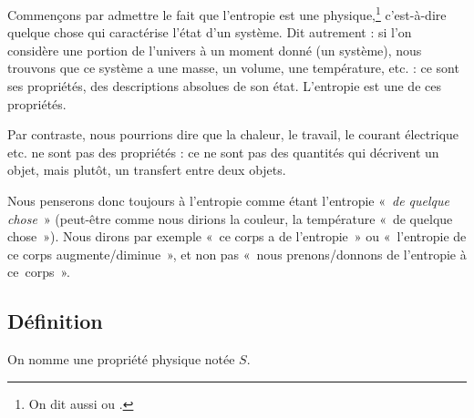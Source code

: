 		Commençons par admettre le fait que l’entropie est une  physique,\footnote{On dit aussi  ou .} c’est-à-dire quelque chose qui caractérise l’état d’un système. Dit autrement : si l’on considère une portion de l’univers à un moment donné (un système), nous trouvons que ce système a une masse, un volume, une température, etc. : ce sont ses propriétés, des descriptions absolues de son état. L’entropie est une de ces propriétés.
		
		Par contraste, nous pourrions dire que la chaleur, le travail, le courant électrique etc. ne sont pas des propriétés : ce ne sont pas des quantités qui décrivent un objet, mais plutôt, un transfert entre deux objets.

		Nous penserons donc toujours à l’entropie comme étant l’entropie «~\emph{de quelque chose}~» (peut-être comme nous dirions la couleur, la température «~de quelque chose~»). Nous dirons par exemple «~ce corps a de l’entropie~» ou «~l’entropie de ce corps augmente/diminue~», et non pas «~nous prenons/donnons de l’entropie à ce~corps~».
	
	\subsection{Définition}
	\label{ch_entropie_definition}
	
		On nomme  une propriété physique notée $S$.
		
